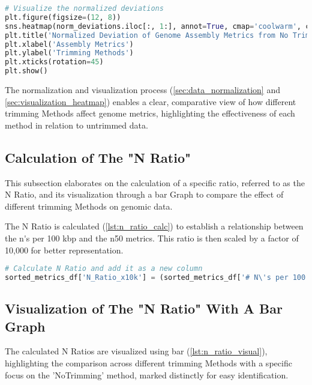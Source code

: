 \begin{lstlisting}[language=Python, label={lst:heatmap}, caption=Heatmap Visualization]
# Visualize the normalized deviations
plt.figure(figsize=(12, 8))
sns.heatmap(norm_deviations.iloc[:, 1:], annot=True, cmap='coolwarm', center=0, yticklabels=norm_deviations['Trimming Parameters'])
plt.title('Normalized Deviation of Genome Assembly Metrics from No Trimming')
plt.xlabel('Assembly Metrics')
plt.ylabel('Trimming Methods')
plt.xticks(rotation=45)
plt.show()
\end{lstlisting}

The normalization and visualization process (\ref{sec:data_normalization} and \ref{sec:visualization_heatmap}) enables a clear, comparative view of how different \gls{trimming} Methods affect \gls{genome} \gls{metrics}, highlighting the effectiveness of each method in relation to untrimmed data.


\subsection{Calculation of The "N Ratio"}\label{sec:calculation_n_ratio}
This subsection elaborates on the calculation of a specific ratio, referred to as the N Ratio, and its visualization through a \gls{bar} Graph to compare the effect of different \gls{trimming} Methods on genomic data.

The N Ratio is calculated (\autoref{lst:n_ratio_calc}) to establish a relationship between the \gls{n's per 100 kbp} and the \gls{n50} \gls{metrics}. This ratio is then scaled by a factor of 10,000 for better representation.

\begin{lstlisting}[language=Python, label={lst:n_ratio_calc}, caption=Calculating of the "N Ratio"]
# Calculate N Ratio and add it as a new column
sorted_metrics_df['N_Ratio_x10k'] = (sorted_metrics_df['# N\'s per 100 kbp'] / sorted_metrics_df['N50']) * 10000
\end{lstlisting}

\subsection{Visualization of The "N Ratio" With A Bar Graph}\label{sec:visualization_n_ratio}
The calculated N Ratios are visualized using \gls{bar} (\autoref{lst:n_ratio_visual}), highlighting the comparison across different \gls{trimming} Methods with a specific focus on the 'NoTrimming' method, marked distinctly for easy identification.

